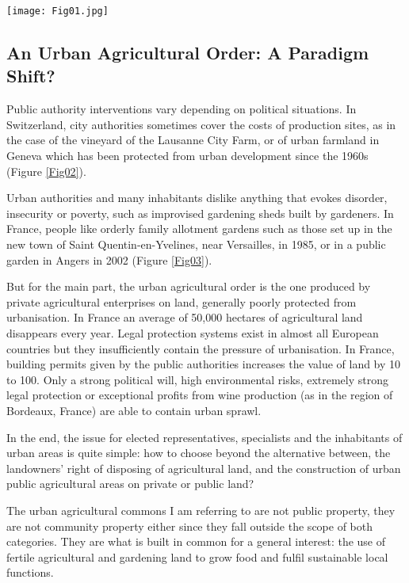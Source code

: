\documentclass[10pt,a4paper]{article}
\begin{document}
\begin{multicols}{2}
\vspace{\baselineskip}

\noindent
\begin{minipage}{\columnwidth}
\centering
\resizebox{\columnwidth}{!}
{\texttt{[image: Fig01.jpg]}}
\end{minipage}

\subsection{An Urban Agricultural Order: A Paradigm Shift?}
\noindent Public authority interventions vary depending on political situations. In Switzerland, city authorities sometimes cover the costs of production sites, as in the case of the vineyard of the Lausanne City Farm, or of urban farmland in Geneva which has been protected from urban development since the 1960s (Figure \ref{Fig02}).

Urban authorities and many inhabitants dislike anything that evokes disorder, insecurity or poverty, such as improvised gardening sheds built by gardeners. In France, people like orderly family allotment gardens such as those set up in the new town of Saint Quentin-en-Yvelines, near Versailles, in 1985, or in a public garden in Angers in 2002 (Figure \ref{Fig03}).

But for the main part, the urban agricultural order is the one produced by private agricultural enterprises on land, generally poorly protected from urbanisation. In France an average of 50,000 hectares of agricultural land disappears every year. Legal protection systems exist in almost all European countries but they insufficiently contain the pressure of urbanisation. In France, building permits given by the public authorities increases the value of land by 10 to 100. Only a strong political will, high environmental risks, extremely strong legal protection or exceptional profits from wine production (as in the region of Bordeaux,  France) are able to contain urban sprawl.

In the end, the issue for elected representatives, specialists and the inhabitants of urban areas is quite simple: how to choose beyond the alternative between, the landowners' right of disposing of agricultural land, and the construction of urban public agricultural areas on private or public land? 

The urban agricultural commons I am referring to are not public property, they are not community property either since they fall outside the scope of both categories. They are what is built in common for a general interest: the use of fertile agricultural and gardening land to grow food and fulfil sustainable local functions.


\end{multicols}
\end{document}
